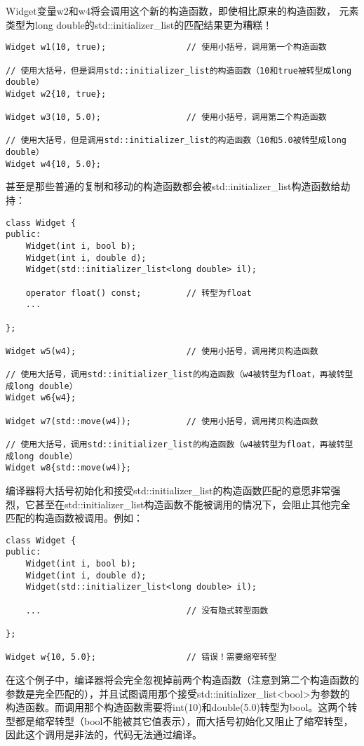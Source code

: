 Widget变量w2和w4将会调用这个新的构造函数，即使相比原来的构造函数，
元素类型为long double的std::initializer\_list的匹配结果更为糟糕！

\begin{lstlisting}
Widget w1(10, true); 				// 使用小括号，调用第一个构造函数

// 使用大括号，但是调用std::initializer_list的构造函数（10和true被转型成long double）
Widget w2{10, true}; 			

Widget w3(10, 5.0); 				// 使用小括号，调用第二个构造函数

// 使用大括号，但是调用std::initializer_list的构造函数（10和5.0被转型成long double）
Widget w4{10, 5.0}; 			
\end{lstlisting}

甚至是那些普通的复制和移动的构造函数都会被std::initializer\_list构造函数给劫持：

\begin{lstlisting}
class Widget {
public:
	Widget(int i, bool b);
	Widget(int i, double d);
	Widget(std::initializer_list<long double> il);

	operator float() const;			// 转型为float
	...

};

Widget w5(w4);						// 使用小括号，调用拷贝构造函数 

// 使用大括号，调用std::initializer_list的构造函数（w4被转型为float，再被转型成long double）
Widget w6{w4};					

Widget w7(std::move(w4)); 			// 使用小括号，调用拷贝构造函数 

// 使用大括号，调用std::initializer_list的构造函数（w4被转型为float，再被转型成long double）
Widget w8{std::move(w4)};		
\end{lstlisting}

编译器将大括号初始化和接受std::initializer\_list的构造函数匹配的意愿非常强烈，它甚至在std::initializer\_list构造函数不能被调用的情况下，会阻止其他完全匹配的构造函数被调用。例如：

\begin{lstlisting}
class Widget {
public:
	Widget(int i, bool b);
	Widget(int i, double d);
	Widget(std::initializer_list<long double> il);

	...								// 没有隐式转型函数

};

Widget w{10, 5.0};					// 错误！需要缩窄转型
\end{lstlisting}

在这个例子中，编译器将会完全忽视掉前两个构造函数（注意到第二个构造函数的参数是完全匹配的），并且试图调用那个接受std::initializer\_list<bool>为参数的构造函数。而调用那个构造函数需要将int(10)和double(5.0)转型为bool。这两个转型都是缩窄转型（bool不能被其它值表示），而大括号初始化又阻止了缩窄转型，因此这个调用是非法的，代码无法通过编译。

